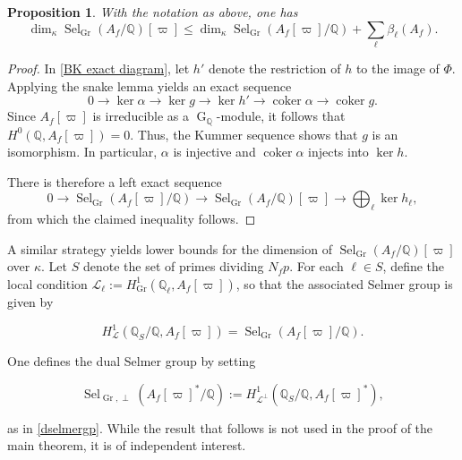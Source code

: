 \documentclass[table]{amsart}
\newtheorem{proposition}[theorem]{Proposition}
\newcommand{\cL}{\mathcal{L}}
\numberwithin{equation}{section}
\begin{document}
\begin{proposition}\label{lower bound propn}
With the notation as above, one has
\[
\dim_{\kappa} \operatorname{Sel}_{\operatorname{Gr}}(A_f/\mathbb{Q})[\varpi] \leq \dim_{\kappa} \operatorname{Sel}_{\operatorname{Gr}}(A_f[\varpi]/\mathbb{Q}) + \sum_{\ell} \beta_\ell(A_f).
\]
\end{proposition}

\begin{proof}
In \eqref{BK exact diagram}, let \( h' \) denote the restriction of \( h \) to the image of \( \Phi \). Applying the snake lemma yields an exact sequence
\[
0 \longrightarrow \ker \alpha \longrightarrow \ker g \longrightarrow \ker h' \longrightarrow \operatorname{coker} \alpha \longrightarrow \operatorname{coker} g.
\]
Since \( A_f[\varpi] \) is irreducible as a \( \operatorname{G}_{\mathbb{Q}} \)-module, it follows that \( H^0(\mathbb{Q}, A_f[\varpi]) = 0 \). Thus, the Kummer sequence shows that \( g \) is an isomorphism. In particular, \( \alpha \) is injective and \( \operatorname{coker} \alpha \) injects into \( \ker h \).

There is therefore a left exact sequence
\begin{equation}\label{selmer left exact}
0 \longrightarrow \operatorname{Sel}_{\operatorname{Gr}}(A_f[\varpi]/\mathbb{Q}) \longrightarrow \operatorname{Sel}_{\operatorname{Gr}}(A_f/\mathbb{Q})[\varpi] \longrightarrow \bigoplus_{\ell} \ker h_\ell,
\end{equation}
from which the claimed inequality follows.
\end{proof}
\par A similar strategy yields lower bounds for the dimension of $\operatorname{Sel}_{\operatorname{Gr}}(A_f/\mathbb{Q})[\varpi]$ over $\kappa$. Let $S$ denote the set of primes dividing $N_f p$. For each $\ell \in S$, define the local condition $\cL_\ell := H^1_{\operatorname{Gr}}(\mathbb{Q}_\ell, A_f[\varpi])$, so that the associated Selmer group is given by

$$
H^1_{\cL}(\mathbb{Q}_S/\mathbb{Q}, A_f[\varpi]) = \operatorname{Sel}_{\operatorname{Gr}}(A_f[\varpi]/\mathbb{Q}).
$$

One defines the dual Selmer group by setting

$$
\operatorname{Sel}_{\operatorname{Gr}, \perp}(A_f[\varpi]^*/\mathbb{Q}) := H^1_{\cL^\perp}(\mathbb{Q}_S/\mathbb{Q}, A_f[\varpi]^*),
$$

as in \eqref{dselmergp}. While the result that follows is not used in the proof of the main theorem, it is of independent interest.
\end{document}
